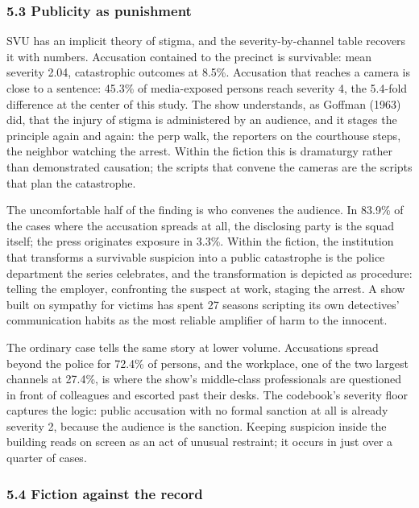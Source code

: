 \documentclass[
]{article}
\begin{document}
\subsubsection{5.3 Publicity as
punishment}\label{publicity-as-punishment}

SVU has an implicit theory of stigma, and the severity-by-channel table
recovers it with numbers. Accusation contained to the precinct is
survivable: mean severity 2.04, catastrophic outcomes at 8.5\%.
Accusation that reaches a camera is close to a sentence: 45.3\% of
media-exposed persons reach severity 4, the 5.4-fold difference at the
center of this study. The show understands, as Goffman (1963) did, that
the injury of stigma is administered by an audience, and it stages the
principle again and again: the perp walk, the reporters on the
courthouse steps, the neighbor watching the arrest. Within the fiction
this is dramaturgy rather than demonstrated causation; the scripts that
convene the cameras are the scripts that plan the catastrophe.

The uncomfortable half of the finding is who convenes the audience. In
83.9\% of the cases where the accusation spreads at all, the disclosing
party is the squad itself; the press originates exposure in 3.3\%.
Within the fiction, the institution that transforms a survivable
suspicion into a public catastrophe is the police department the series
celebrates, and the transformation is depicted as procedure: telling the
employer, confronting the suspect at work, staging the arrest. A show
built on sympathy for victims has spent 27 seasons scripting its own
detectives' communication habits as the most reliable amplifier of harm
to the innocent.

The ordinary case tells the same story at lower volume. Accusations
spread beyond the police for 72.4\% of persons, and the workplace, one
of the two largest channels at 27.4\%, is where the show's middle-class
professionals are questioned in front of colleagues and escorted past
their desks. The codebook's severity floor captures the logic: public
accusation with no formal sanction at all is already severity 2, because
the audience is the sanction. Keeping suspicion inside the building
reads on screen as an act of unusual restraint; it occurs in just over a
quarter of cases.

\subsubsection{5.4 Fiction against the
record}\label{fiction-against-the-record}
\end{document}
